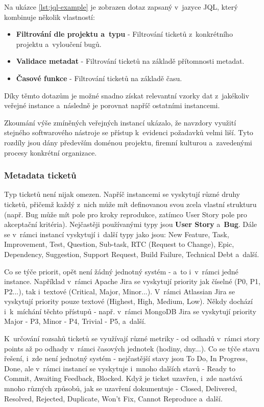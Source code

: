 \documentclass[czech, ing, kiv, he, iso690numb, viewonly]{fasthesis}
\begin{document}
Na ukázce \ref{lst:jql-example} je zobrazen dotaz zapsaný v~jazyce JQL, který kombinuje několik vlastností:
\begin{itemize}
    \item \textbf{Filtrování dle projektu a~typu} - Filtrování ticketů z~konkrétního projektu a~vyloučení bugů.
    \item \textbf{Validace metadat} - Filtrování ticketů na základě přítomnosti metadat.
    \item \textbf{Časové funkce} - Filtrování ticketů na základě času.
\end{itemize}

Díky těmto dotazům je možné snadno získat relevantní vzorky dat z~jakékoliv veřejné instance a~následně je porovnat napříč ostatními instancemi. 

Zkoumání výše zmíněných veřejných instancí ukázalo, 
že navzdory využití stejného softwarového nástroje se přístup k~evidenci požadavků velmi liší. 
Tyto rozdíly jsou dány především doménou projektu, firemní kulturou a~zavedenými procesy konkrétní organizace. 

\subsubsection*{Metadata ticketů}
Typ ticketů není nijak omezen. Napříč instancemi se vyskytují různé druhy ticketů, přičemž každý z~nich může mít
definovanou svou zcela vlastní strukturu (např. Bug může mít pole pro kroky reprodukce, zatímco User Story pole pro akceptační kritéria).
Nejčastěji používanými typy jsou \textbf{User Story} a~\textbf{Bug}. Dále se v~rámci instancí vyskytují i~další typy jako jsou: 
New Feature, Task, Improvement, Test, Question, Sub-task, RTC (Request to Change), Epic, Dependency, Suggestion, Support Request, Build Failure,
Technical Debt a~další. 

Co se týče priorit, opět není žádný jednotný systém - a~to i~v~rámci jedné instance. Například v~rámci Apache Jira se 
vyskytují priority jak číselné (P0, P1, P2...), tak i~textové (Critical, Major, Minor...). V~rámci Atlassian Jira se vyskytují priority pouze textové (Highest, High, Medium, Low).
Někdy dochází i~k~míchání těchto přístupů - např. v~rámci MongoDB Jira se vyskytují priority Major - P3, Minor - P4, Trivial - P5, a~další.

K~určování rozsahů ticketů se využívají různé metriky - od odhadů v~rámci story points až po odhady v~rámci časových jednotek (hodiny, dny...). 
Co se týče stavu řešení, i~zde není jednotný systém - nejčastější stavy jsou To Do, In Progress, Done, 
ale v~rámci instancí se vyskytuje i~mnoho dalších stavů - Ready to Commit, Awaiting Feedback, Blocked. Když je ticket uzavřen, 
i~zde nastává mnoho různých způsobů, jak se uzavření dokumentuje - Closed, Delivered, Resolved, Rejected, Duplicate, Won't Fix, Cannot Reproduce a~další.
\end{document}
